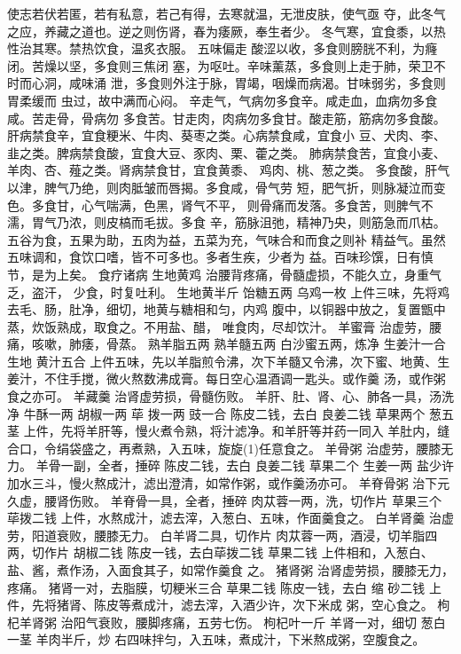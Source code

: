 \documentclass[12pt,UTF8]{ctexbook}
\begin{document}
使志若伏若匿，若有私意，若己有得，去寒就温，无泄皮肤，使气亟
夺，此冬气之应，养藏之道也。逆之则伤肾，春为痿厥，奉生者少。
冬气寒，宜食黍，以热性治其寒。禁热饮食，温炙衣服。
五味偏走
酸涩以收，多食则膀胱不利，为癃闭。苦燥以坚，多食则三焦闭
塞，为呕吐。辛味薰蒸，多食则上走于肺，荣卫不时而心洞，咸味涌
泄，多食则外注于脉，胃竭，咽燥而病渴。甘味弱劣，多食则胃柔缓而
虫过，故中满而心闷。
辛走气，气病勿多食辛。咸走血，血病勿多食咸。苦走骨，骨病勿
多食苦。甘走肉，肉病勿多食甘。酸走筋，筋病勿多食酸。
肝病禁食辛，宜食粳米、牛肉、葵枣之类。心病禁食咸，宜食小
豆、犬肉、李、韭之类。脾病禁食酸，宜食大豆、豕肉、栗、藿之类。
肺病禁食苦，宜食小麦、羊肉、杏、薤之类。肾病禁食甘，宜食黄黍、
鸡肉、桃、葱之类。
多食酸，肝气以津，脾气乃绝，则肉胝皱而唇揭。多食咸，骨气劳
短，肥气折，则脉凝泣而变色。多食甘，心气喘满，色黑，肾气不平，
则骨痛而发落。多食苦，则脾气不濡，胃气乃浓，则皮槁而毛拔。多食
辛，筋脉沮弛，精神乃央，则筋急而爪枯。
五谷为食，五果为助，五肉为益，五菜为充，气味合和而食之则补
精益气。虽然五味调和，食饮口嗜，皆不可多也。多者生疾，少者为
益。百味珍馔，日有慎节，是为上矣。
食疗诸病
生地黄鸡 治腰背疼痛，骨髓虚损，不能久立，身重气乏，盗汗，
少食，时复吐利。
生地黄半斤 饴糖五两 乌鸡一枚
上件三味，先将鸡去毛、肠，肚净，细切，地黄与糖相和匀，内鸡
腹中，以铜器中放之，复置甑中蒸，炊饭熟成，取食之。不用盐、醋，
唯食肉，尽却饮汁。
羊蜜膏 治虚劳，腰痛，咳嗽，肺痿，骨蒸。
熟羊脂五两 熟羊髓五两 白沙蜜五两，炼净 生姜汁一合 生地
黄汁五合
上件五味，先以羊脂煎令沸，次下羊髓又令沸，次下蜜、地黄、生
姜汁，不住手搅，微火熬数沸成膏。每日空心温酒调一匙头。或作羹
汤，或作粥食之亦可。
羊藏羹 治肾虚劳损，骨髓伤败。
羊肝、肚、肾、心、肺各一具，汤洗净 牛酥一两 胡椒一两 荜
拨一两 豉一合 陈皮二钱，去白 良姜二钱 草果两个 葱五茎
上件，先将羊肝等，慢火煮令熟，将汁滤净。和羊肝等并药一同入
羊肚内，缝合口，令绢袋盛之，再煮熟，入五味，旋旋(1)任意食之。
羊骨粥 治虚劳，腰膝无力。
羊骨一副，全者，捶碎 陈皮二钱，去白 良姜二钱 草果二个
生姜一两 盐少许
加水三斗，慢火熬成汁，滤出澄清，如常作粥，或作羹汤亦可。
羊脊骨粥 治下元久虚，腰肾伤败。
羊脊骨一具，全者，捶碎 肉苁蓉一两，洗，切作片 草果三个
荜拨二钱
上件，水熬成汁，滤去滓，入葱白、五味，作面羹食之。
白羊肾羹 治虚劳，阳道衰败，腰膝无力。
白羊肾二具，切作片 肉苁蓉一两，酒浸，切羊脂四两，切作片
胡椒二钱 陈皮一钱，去白荜拨二钱 草果二钱
上件相和，入葱白、盐、酱，煮作汤，入面食其子，如常作羹食
之。
猪肾粥 治肾虚劳损，腰膝无力，疼痛。
猪肾一对，去脂膜，切粳米三合 草果二钱 陈皮一钱，去白 缩
砂二钱
上件，先将猪肾、陈皮等煮成汁，滤去滓，入酒少许，次下米成
粥，空心食之。
枸杞羊肾粥 治阳气衰败，腰脚疼痛，五劳七伤。
枸杞叶一斤 羊肾一对，细切 葱白一茎 羊肉半斤，炒
右四味拌匀，入五味，煮成汁，下米熬成粥，空腹食之。
\end{document}
